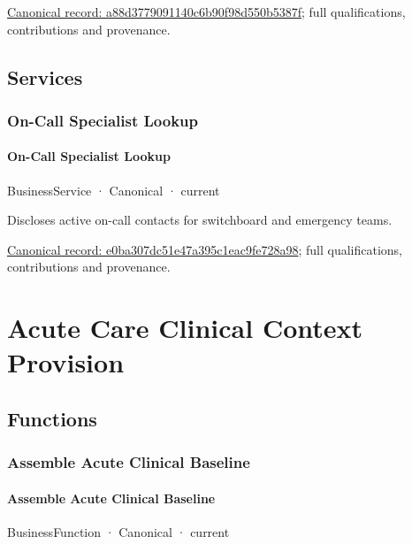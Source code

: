 {\footnotesize \href{../../../../continuum/business/business-function/a88d3779091140c6b90f98d550b5387f.md}{Canonical record: a88d3779091140c6b90f98d550b5387f}; full qualifications, contributions and provenance.}\par
\subsection{Services}

\subsubsection{On-Call Specialist Lookup}

\paragraph{On-Call Specialist Lookup}

\label{element:e0ba307dc51e47a395c1eac9fe728a98}
{\small BusinessService · Canonical · current}\par

Discloses active on-call contacts for switchboard and emergency teams.


{\footnotesize \href{../../../../continuum/business/business-service/e0ba307dc51e47a395c1eac9fe728a98.md}{Canonical record: e0ba307dc51e47a395c1eac9fe728a98}; full qualifications, contributions and provenance.}\par
\section{Acute Care Clinical Context Provision}

\subsection{Functions}

\subsubsection{Assemble Acute Clinical Baseline}

\paragraph{Assemble Acute Clinical Baseline}

\label{element:be64da1302bf4c4bae357295612e8e6e}
{\small BusinessFunction · Canonical · current}\par

